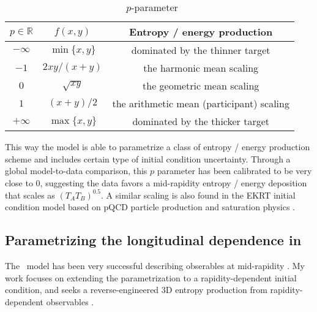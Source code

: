 \begin{table}
\centering
\caption{\trento\ $p$-parameter}\label{tab:trento-p}
\begin{tabular}{ccc}
\hline
$p\in \mathbb{R}$ & $f(x, y)$ & Entropy / energy production\\
\hline
$-\infty$ & $\min\{x, y\}$ &  dominated by the thinner target\\
$-1$ & $2xy/(x+y)$ &   the harmonic mean scaling\\
$0$ & $\sqrt{xy}$ &  the geometric mean scaling\\
$1$ & $(x+y)/2$ &  the arithmetic mean (participant) scaling\\
$+\infty$ & $\max\{x, y\}$ &  dominated by the thicker target \\
\hline
\end{tabular}
\end{table}
This way the model is able to parametrize a class of entropy / energy production scheme and includes certain type of initial condition uncertainty.
Through a global model-to-data comparison, this $p$ parameter has been calibrated to be very close to 0, suggesting the data favors a mid-rapidity entropy / energy deposition that scales as $(T_A T_B)^{0.5}$.
A similar scaling is also found in the EKRT initial condition model based on pQCD particle production and saturation physics \cite{Eskola:1999fc}.

\subsection{Parametrizing the longitudinal dependence in \trento}
The \trento\ model has been very successful describing obserables at mid-rapidity \cite{Moreland:2014oya,Bernhard:2016tnd,Moreland:2018gsh}.
My work focuses on extending the parametrization to a rapidity-dependent initial condition, and seeks a reverse-engineered 3D entropy production from rapidity-dependent observables \cite{PhysRevC.96.044912}.

